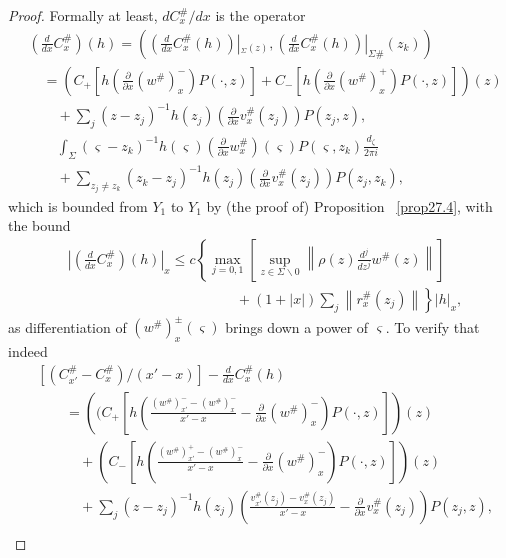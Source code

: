\documentclass{surv-l}
\theoremstyle{plain}
\theoremstyle{definition}
\numberwithin{equation}{chapter}
\begin{document}
\begin{proof} Formally at least, $dC_{x}^{\#}/dx$ is the operator
\begin{align}\label{eq28.22}
&\left(\frac{d}{dx}C_{x}^{\#}\right)(h)=\left(\left(\frac{d}{dx}C_{x}^{\#}(h)\right)\left|_{_\Sigma(z)}, \left( \frac{d}{dx}C_{x}^{\#}(h)\right)\right|_{\Sigma\#}(z_{k})\right)\\ \nonumber
&\quad=\left(C_{+}\left[h\left(\frac{\partial}{\partial x}(w^{\#})_{x}^{-}\right)P(\cdot, z)\right]+C_{-}\left[h\left(\frac{\partial}{\partial x}(w^{\#})_{x}^{+}\right)P(\cdot, z)\right]\right)(z)\\ \nonumber
&\quad\quad+\sum_{j} (z -z_{j})^{-1}h(z_{j})\left(\frac{\partial}{\partial x}v_{x}^{\#}(z_{j})\right)P(z_{j}, z),\\ \nonumber
&\quad\quad\int_{\Sigma}(\varsigma-z_{k})^{-1}h(\varsigma)\left(\frac{\partial}{\partial x}w_{x}^{\#}\right)(\varsigma)P(\varsigma, z_{k})\frac{d_{\zeta}}{2\pi i}\\ \nonumber
&\quad\quad+\sum_{z_{j}\neq z_{k}}(z_{k}-z_{j})^{-1}h(z_{j})\left(\frac{\partial}{\partial x}v_{x}^{\#}(z_{j})\right)P(z_{j}, z_{k}),
\end{align}
which is bounded from $Y_{1}$ to $Y_{1}$ by (the proof of) Proposition ~\ref{prop27.4}, with the bound
\begin{align}\label{eq28.23}
&\left|\left( \frac{d}{dx}C_{x}^{\#}\right)(h)\right|_{x}\leq c\left\{\max_{j=0,1}\left[\sup_{z\in\Sigma\backslash 0}\left\|\rho(z)\frac{d^{j}}{d{z^{j}}}w^{\#}(z)\right\|\right]\right.\\
&\qquad\qquad\qquad\qquad\qquad\qquad+\left.(1+|x|)\sum_{j}\left\| r_{x}^{\#}(z_{j})\right\|\right\} |h|_{x},\nonumber
\end{align}
as differentiation of $(w^{\#})_{x}^{\pm}(\varsigma)$ brings down a power of $\varsigma$. To verify that indeed
\begin{align}\label{eq28.24}
&[(C_{x'}^{\#}-C_{x}^{\#})/(x'-x)]- \frac{d}{dx}C_{x}^{\#}(h)\\ \nonumber
&\qquad=\left((C_{+}\left[h\left(\frac{(w^{\#})_{x'}^{-}-(w^{\#})_{x}^{-}}{x'-x}-\frac{\partial}{\partial x}(w^{\#})_{x}^{-}\right)P(\cdot,z)\right]\right)(z)\\ \nonumber
&\qquad\quad+\left(C_{-}\left[h\left(\frac{(w^{\#})_{x'}^{+}-(w^{\#})_{x}^{-}}{x'-x}-\frac{\partial}{\partial x}(w^{\#})_{x}^{-}\right)P(\cdot, z)\right]\right)(z)\\ \nonumber
&\qquad\quad+\sum_{j}(z-z_{j})^{-1}h(z_{j})\left(\frac{v_{x'}^{\#}(z_{j})-v_{x}^{\#}(z_{j})}{x'-x}-\frac{\partial}{\partial x}v_{x}^{\#}(z_{j})\right)P(z_{j}, z),\\ \nonumber

\end{align}
\end{proof}
\end{document}
